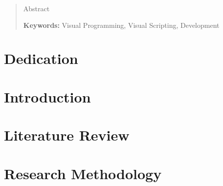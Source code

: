 \documentclass[12pt]{report} %
\begin{document}
\renewcommand\abstractname{\large\bfseries\filcenter\uppercase{Summary}}
\begin{abstract}
	\thispagestyle{plain}
	\setcounter{page}{3}

	Abstract

	\textbf{Keywords:} %
	Visual Programming, Visual Scripting, Development
	\vfill
\end{abstract}
\newpage %
\thispagestyle{empty}
\mbox{}
\chapter*{Dedication}

\setcounter{page}{5}

\vfill

\newpage %
\thispagestyle{empty}
\mbox{}



\tableofcontents
\thispagestyle{fancy}

\newpage %
\thispagestyle{empty}
\mbox{}

\listoffigures
\thispagestyle{fancy}

\newpage %
\thispagestyle{empty}
\mbox{}

\listoftables
\thispagestyle{fancy}

\newpage %
\thispagestyle{empty}
\mbox{}


\clearpage
{} %

\chapter{Introduction}

\chapter{Literature Review}
\label{sec:literatureReview}

\chapter{Research Methodology}
\label{chap:researchMethodology}
\end{document}
